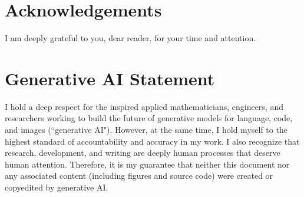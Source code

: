 \documentclass[conference]{IEEEtran}
\begin{document}
\section*{Acknowledgements}

I am deeply grateful to you, dear reader, for your time and attention.

\section*{Generative AI Statement}

I hold a deep respect for the inspired applied mathematicians, engineers, and researchers working to build the future of generative models for language, code, and images (``generative AI").  However, at the same time, I hold myself to the highest standard of accountability and accuracy in my work.  I also recognize that research, development, and writing are deeply human processes that deserve human attention.  Therefore, it is my guarantee that neither this document nor any associated content (including figures and source code) were created or copyedited by generative AI.
\end{document}
